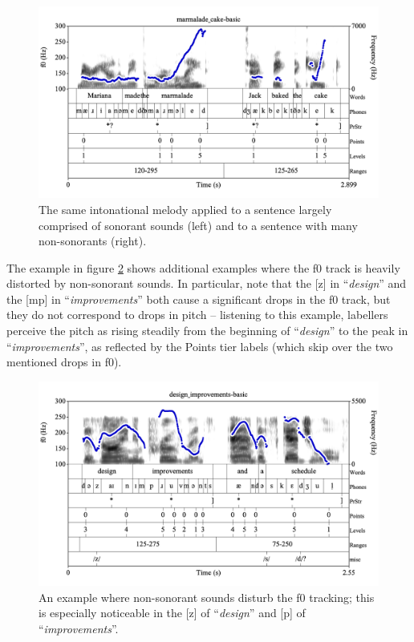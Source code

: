 \documentclass[11pt, twoside]{memoir}
\def\langtext#1{\textit{#1}}
\begin{document}
\begin{figure}[H]
\centering
\includegraphics[width=.875\linewidth]{Appendix-marmalade_cake.png}
\caption{The same intonational melody applied to a sentence largely comprised of sonorant sounds (left) and to a sentence with many non-sonorants (right).
\label{fig:marmalade cake f0-tracking}
}
\end{figure}
The example in figure \ref{fig:design improvements f0-tracking} shows additional examples where the f0 track is heavily distorted by non-sonorant sounds.  In particular, note that the [z] in “\langtext{design}” and the [mp] in “\langtext{improvements}” both cause a significant drops in the f0 track, but they do not correspond to drops in pitch – listening to this example, labellers perceive the pitch as rising steadily from the beginning of “\langtext{design}” to the peak in “\langtext{improvements}”, as reflected by the Points tier labels (which skip over the two mentioned drops in f0).
\begin{figure}[H]
\centering
\includegraphics[width=.875\linewidth]{Appendix-design_improvements.png}
\caption{An example where non-sonorant sounds disturb the f0 tracking; this is especially noticeable in the [z] of “\langtext{design}” and [p] of “\langtext{improvements}”.
\label{fig:design improvements f0-tracking}
}
\end{figure}
\end{document}
